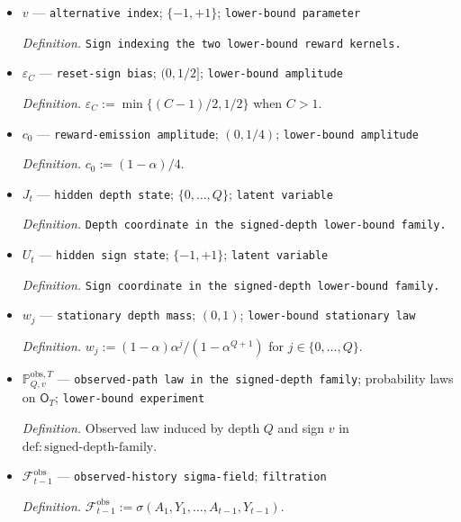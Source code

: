 \documentclass{article}
\begin{document}
\begin{itemize}
  \par\smallskip\noindent\emph{Definition.} \texttt{Depth parameter of the lower-\allowbreak{}bound experiment.}
  \item \(v\) --- \texttt{alternative index}; \(\{-1,+1\}\); \texttt{lower-\allowbreak{}bound parameter}
  \par\smallskip\noindent\emph{Definition.} \texttt{Sign indexing the two lower-\allowbreak{}bound reward kernels.}
  \item \(\varepsilon_C\) --- \texttt{reset-\allowbreak{}sign bias}; \((0,1/2]\); \texttt{lower-\allowbreak{}bound amplitude}
  \par\smallskip\noindent\emph{Definition.} \(\varepsilon_C:=\min\{(C-1)/2,1/2\}\) when \(C>1\).
  \item \(c_0\) --- \texttt{reward-\allowbreak{}emission amplitude}; \((0,1/4)\); \texttt{lower-\allowbreak{}bound amplitude}
  \par\smallskip\noindent\emph{Definition.} \(c_0:=(1-\alpha)/4\).
  \item \(J_t\) --- \texttt{hidden depth state}; \(\{0,\ldots,Q\}\); \texttt{latent variable}
  \par\smallskip\noindent\emph{Definition.} \texttt{Depth coordinate in the signed-\allowbreak{}depth lower-\allowbreak{}bound family.}
  \item \(U_t\) --- \texttt{hidden sign state}; \(\{-1,+1\}\); \texttt{latent variable}
  \par\smallskip\noindent\emph{Definition.} \texttt{Sign coordinate in the signed-\allowbreak{}depth lower-\allowbreak{}bound family.}
  \item \(w_j\) --- \texttt{stationary depth mass}; \((0,1)\); \texttt{lower-\allowbreak{}bound stationary law}
  \par\smallskip\noindent\emph{Definition.} \(w_j:=(1-\alpha)\alpha^j/(1-\alpha^{Q+1})\) for \(j\in\{0,\ldots,Q\}\).
  \item \(\mathbb P_{Q,v}^{\mathrm{obs},T}\) --- \texttt{observed-\allowbreak{}path law in the signed-\allowbreak{}depth family}; probability laws on \(\mathsf O_T\); \texttt{lower-\allowbreak{}bound experiment}
  \par\smallskip\noindent\emph{Definition.} Observed law induced by depth \(Q\) and sign \(v\) in \(\mathrm{def{:}signed\text{-}depth\text{-}family}\).
  \item \(\mathcal F_{t-1}^{\mathrm{obs}}\) --- \texttt{observed-\allowbreak{}history sigma-\allowbreak{}field}; \texttt{filtration}
  \par\smallskip\noindent\emph{Definition.} \(\mathcal F_{t-1}^{\mathrm{obs}}:=\sigma(A_1,Y_1,\ldots,A_{t-1},Y_{t-1})\).

\end{itemize}
\end{document}
